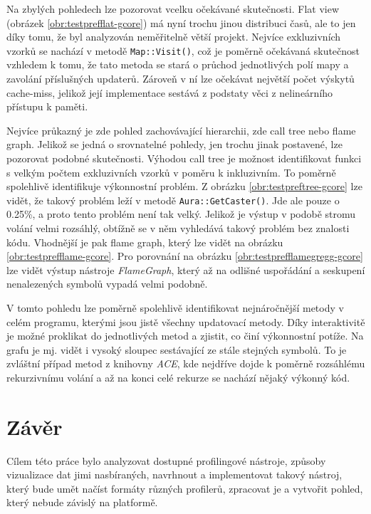 \documentclass[czech,BP]{thesiskiv}
\begin{document}
Na zbylých pohledech lze pozorovat vcelku očekávané skutečnosti. Flat view (obrázek \ref{obr:testprefflat-gcore}) má nyní trochu jinou distribuci časů, ale to jen díky tomu, že byl analyzován neměřitelně větší projekt. Nejvíce exkluzivních vzorků se nachází v metodě \texttt{Map::Visit()}, což je poměrně očekávaná skutečnost vzhledem k tomu, že tato metoda se stará o průchod jednotlivých polí mapy a zavolání příslušných updaterů. Zároveň v ní lze očekávat největší počet výskytů cache-miss, jelikož její implementace sestává z podstaty věci z nelineárního přístupu k paměti.

Nejvíce průkazný je zde pohled zachovávající hierarchii, zde call tree nebo flame graph. Jelikož se jedná o srovnatelné pohledy, jen trochu jinak postavené, lze pozorovat podobné skutečnosti. Výhodou call tree je možnost identifikovat funkci s velkým počtem exkluzivních vzorků v poměru k inkluzivním. To poměrně spolehlivě identifikuje výkonnostní problém. Z obrázku \ref{obr:testpreftree-gcore} lze vidět, že takový problém leží v metodě \texttt{Aura::GetCaster()}. Jde ale pouze o 0.25\%, a proto tento problém není tak velký. Jelikož je výstup v podobě stromu volání velmi rozsáhlý, obtížně se v něm vyhledává takový problém bez znalosti kódu. Vhodnější je pak flame graph, který lze vidět na obrázku \ref{obr:testprefflame-gcore}. Pro porovnání na obrázku \ref{obr:testprefflamegregg-gcore} lze vidět výstup nástroje \emph{FlameGraph}, který až na odlišné uspořádání a seskupení nenalezených symbolů vypadá velmi podobně.

V tomto pohledu lze poměrně spolehlivě identifikovat nejnáročnější metody v celém programu, kterými jsou jistě všechny updatovací metody. Díky interaktivitě je možné proklikat do jednotlivých metod a zjistit, co činí výkonnostní potíže. Na grafu je mj. vidět i vysoký sloupec sestávající ze stále stejných symbolů. To je zvláštní případ metod z knihovny \emph{ACE}, kde nejdříve dojde k poměrně rozsáhlému rekurzivnímu volání a až na konci celé rekurze se nachází nějaký výkonný kód. 




\newpage

\chapter{Závěr}

Cílem této práce bylo analyzovat dostupné profilingové nástroje, způsoby vizualizace dat jimi nasbíraných, navrhnout a implementovat takový nástroj, který bude umět načíst formáty různých profilerů, zpracovat je a vytvořit pohled, který nebude závislý na platformě.
\end{document}
